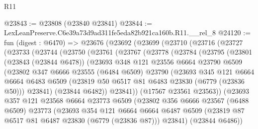 \begin{lexlean}{R11}
\begin{coremodule}
@23843 := @23808 (@23840 @23841)
@23844 := LexLeanPreserve.C6e39a73d9ad311fe5eda82b921ca160b.R11.__rel_8
@24120 := fun (digest : @6470) =>
  @23676
    (@23692
      (@23699
        (@23710
          (@23716
            (@23727
              (@23733
                (@23744
                  (@23750
                    (@23761
                      (@23767
                        (@23778
                          (@23784
                            (@23795
                              (@23801
                                (@23843 (@23844 @6478))
                                (@23693
                                  @348
                                  @121
                                  @23556
                                  @6664
                                  @23790
                                  @6509
                                  (@23802
                                    @347
                                    @6666
                                    @23555
                                    (@6484 @6509)
                                    @23790
                                    (@23693
                                      @345
                                      @121
                                      @6664
                                      @6664
                                      @6483
                                      @6509
                                      (@23819 @50 @6517 @81 @6483 @23830 (@6779 (@23836 @50)))
                                      @23841)
                                    (@23844 @6482))
                                  @23841))
                              (@17567 @23561 @23563))
                            (@23693
                              @357
                              @121
                              @23568
                              @6664
                              @23773
                              @6509
                              (@23802
                                @356
                                @6666
                                @23567
                                (@6488 @6509)
                                @23773
                                (@23693
                                  @354
                                  @121
                                  @6664
                                  @6664
                                  @6487
                                  @6509
                                  (@23819 @87 @6517 @81 @6487 @23830 (@6779 (@23836 @87)))
                                  @23841)
                                (@23844 @6486))

\end{coremodule}
\end{lexlean}
